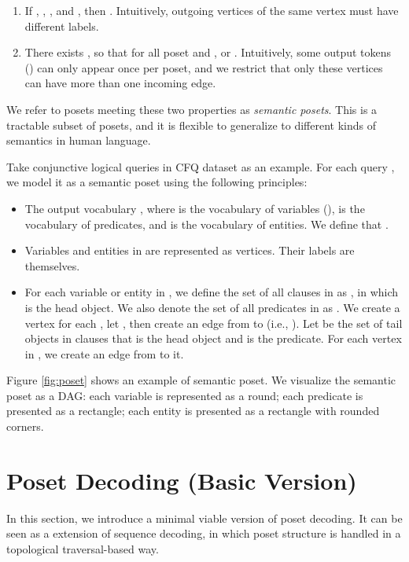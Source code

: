 \documentclass{article}
\begin{document}
\begin{enumerate}
\item If , , , and , then .
Intuitively, outgoing vertices of the same vertex must have different labels.
\item There exists , so that for all poset  and , or .
Intuitively, some output tokens () can only appear once per poset, and we restrict that only these vertices can have more than one incoming edge.
\end{enumerate}

We refer to posets meeting these two properties as \emph{semantic posets}.
This is a tractable subset of posets, and it is flexible to generalize to different kinds of semantics in human language.

Take conjunctive logical queries  in CFQ dataset as an example.
For each query , we model it as a semantic poset  using the following principles:

\begin{itemize}
\item The output vocabulary , where  is the vocabulary of variables (),  is the vocabulary of predicates, and  is the vocabulary of entities.
We define that .
\item Variables and entities in  are represented as vertices. Their labels are themselves.
\item For each variable or entity  in , we define the set of all clauses in  as , in which  is the head object.
We also denote the set of all predicates in  as .
We create a vertex  for each , let , then create an edge from  to  (i.e., ).
Let  be the set of tail objects in clauses that  is the head object and  is the predicate.
For each vertex in , we create an edge from  to it.
\end{itemize}

Figure \ref{fig:poset} shows an example of semantic poset.
We visualize the semantic poset as a DAG:
each variable is represented as a round;
each predicate is presented as a rectangle;
each entity is presented as a rectangle with rounded corners.

\section{Poset Decoding (Basic Version)}
\label{section:base}

In this section, we introduce a minimal viable version of poset decoding. It can be seen as a extension of sequence decoding, in which poset structure is handled in a topological traversal-based way.
\end{document}
